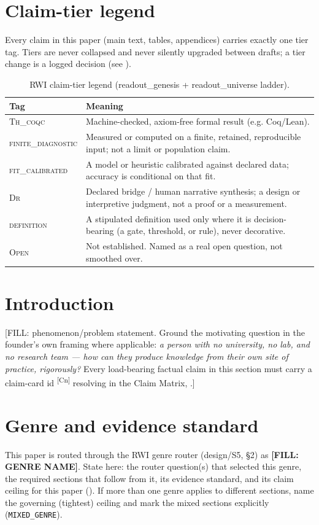 \documentclass[11pt]{article}
\newcommand{\ThCoqc}{\textsc{Th\_coqc}}
\newcommand{\FiniteDiag}{\textsc{finite\_diagnostic}}
\newcommand{\FitCal}{\textsc{fit\_calibrated}}
\newcommand{\DrTier}{\textsc{Dr}}
\newcommand{\DefTier}{\textsc{definition}}
\newcommand{\OpenTier}{\textsc{Open}}
\newcommand{\claimref}[1]{\textsuperscript{[#1]}}
\begin{document}
\section{Claim-tier legend}
\label{sec:tiers}
Every claim in this paper (main text, tables, appendices) carries exactly one
tier tag. Tiers are never collapsed and never silently upgraded between
drafts; a tier change is a logged decision (see ).

\begin{table}[H]
\centering
\small
\begin{tabularx}{\linewidth}{@{}l X@{}}
\toprule
\textbf{Tag} & \textbf{Meaning} \\
\midrule
\ThCoqc{} & Machine-checked, axiom-free formal result (e.g. Coq/Lean). \\
\FiniteDiag{} & Measured or computed on a finite, retained, reproducible input; not a limit or population claim. \\
\FitCal{} & A model or heuristic calibrated against declared data; accuracy is conditional on that fit. \\
\DrTier{} & Declared bridge / human narrative synthesis; a design or interpretive judgment, not a proof or a measurement. \\
\DefTier{} & A stipulated definition used only where it is decision-bearing (a gate, threshold, or rule), never decorative. \\
\OpenTier{} & Not established. Named as a real open question, not smoothed over. \\
\bottomrule
\end{tabularx}
\caption{RWI claim-tier legend (readout\_genesis + readout\_universe ladder).}
\label{tab:tiers}
\end{table}

\section{Introduction}
\label{sec:intro}
[FILL: phenomenon/problem statement. Ground the motivating question in the
founder's own framing where applicable: \emph{a person with no university, no
lab, and no research team --- how can they produce knowledge from their own
site of practice, rigorously?} Every load-bearing factual claim in this
section must carry a claim-card id \claimref{Cn} resolving in the Claim
Matrix, .]

\section{Genre and evidence standard}
\label{sec:genre}
This paper is routed through the RWI genre router (design/S5, \S2) as
\textbf{[FILL: GENRE NAME]}. State here: the router question(s) that selected
this genre, the required sections that follow from it, its evidence standard,
and its claim ceiling for this paper (). If more than one
genre applies to different sections, name the governing (tightest) ceiling
and mark the mixed sections explicitly (\texttt{MIXED\_GENRE}).
\end{document}
